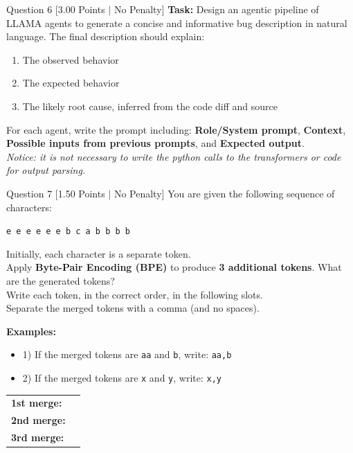 \documentclass[11pt,a4paper]{article}
\begin{document}
\begin{questionbox}{Question 6 \hfill [3.00 Points $\vert$ No Penalty]}
\medskip
\noindent
\textbf{Task:} Design an agentic pipeline of LLAMA agents to generate a concise and informative bug description in natural language. The final description should explain:
\begin{enumerate}[label=\alph*.,leftmargin=2em]
    \item The observed behavior
    \item The expected behavior
    \item The likely root cause, inferred from the code diff and source
\end{enumerate}
For each agent, write the prompt including: \textbf{Role/System prompt}, \textbf{Context}, \textbf{Possible inputs from previous prompts}, and \textbf{Expected output}.\\
\textit{Notice: it is not necessary to write the python calls to the transformers or code for output parsing.}
\end{questionbox}

\newpage

\begin{questionbox}{Question 7 \hfill [1.50 Points $\vert$ No Penalty]}
You are given the following sequence of characters:
\begin{center}
\texttt{e e e e e e b c a b b b b}
\end{center}
Initially, each character is a separate token.\\
Apply \textbf{Byte-Pair Encoding (BPE)} to produce \textbf{3 additional tokens}. What are the generated tokens?\\
Write each token, in the correct order, in the following slots.\\
Separate the merged tokens with a comma (and no spaces).

\medskip
\noindent
\textbf{Examples:}
\begin{itemize}[leftmargin=1.5em]
    \item 1) If the merged tokens are \texttt{aa} and \texttt{b}, write: \texttt{aa,b}
    \item 2) If the merged tokens are \texttt{x} and \texttt{y}, write: \texttt{x,y}
\end{itemize}

\medskip
\begin{tabular}{ll}
\textbf{1st merge:} & \underline{\hspace{4cm}} \\
\textbf{2nd merge:} & \underline{\hspace{4cm}} \\
\textbf{3rd merge:} & \underline{\hspace{4cm}} \\
\end{tabular}
\end{questionbox}
\end{document}
